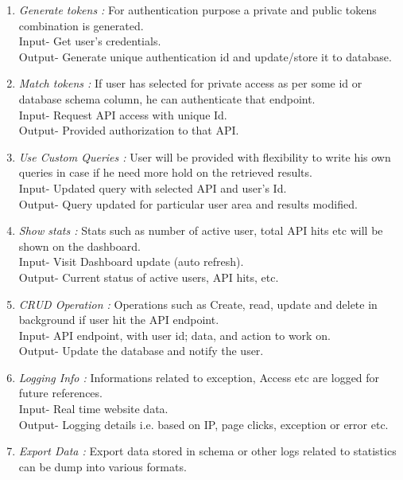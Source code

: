 \documentclass[a4paper,12pt]{report}
\begin{document}
\begin{enumerate}
{        Output- Authenticated schema (accessible only by valid authority).
      }
      \item {\emph {Generate tokens : }For authentication purpose a private and public tokens combination is generated.\\
        Input- Get user’s credentials. \\      
        Output- Generate unique authentication id and update/store it to database.
      }
      \item {\emph {Match tokens :} If user has selected for private access as per some id or database schema column, he can authenticate that endpoint.\\
        Input- Request API access with unique Id. \\
        Output- Provided authorization to that API.
      }
      \item {\emph {Use Custom Queries : }  User will be provided with flexibility to write his own queries in case if he need more hold on the retrieved results. \\
        Input- Updated query with selected API and user’s Id. \\
        Output- Query updated for particular user area and results modified.      
      }
      \item {\emph {Show stats :} Stats such as number of active user, total API hits etc will be shown on the dashboard. \\
        Input- Visit Dashboard update (auto refresh). \\
        Output- Current status of active users, API hits, etc.
      }
      \item {\emph {CRUD Operation :}  Operations such as Create, read, update and delete in background if user hit the API endpoint. \\
        Input- API endpoint, with user id; data, and action to work on. \\
        Output- Update the database and notify the user.
      }
      \item {\emph {Logging Info :} Informations related to exception, Access etc are logged for future references. \\
        Input- Real time website data. \\
        Output- Logging details i.e. based on IP, page clicks, exception or error etc.  
      }
      \item {\emph {Export Data : } Export data stored in schema or other logs related to statistics can be dump into various formats. \\
}
\end{enumerate}
\end{document}

